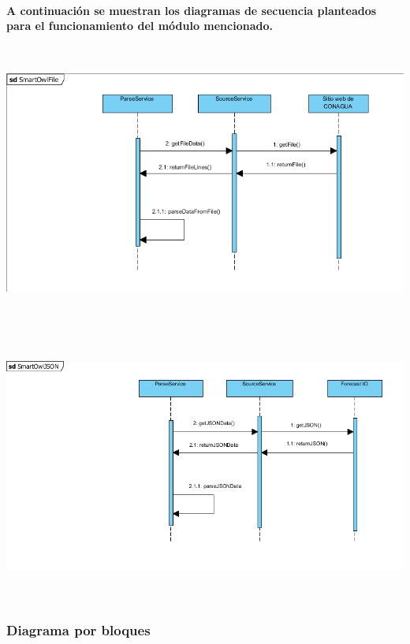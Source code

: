     \paragraph{A continuación se muestran los diagramas de secuencia planteados para el funcionamiento del módulo mencionado.}
    \begin{center}
      \includegraphics[width=14cm,height=9cm]{./images/SmartOwlSequenceDiagram}
    \end{center}
    \begin{center}
      \includegraphics[width=14cm,height=9cm]{./images/SmartOwlSequenceDiagram2}
    \end{center}
    \subsubsection{Diagrama por bloques}